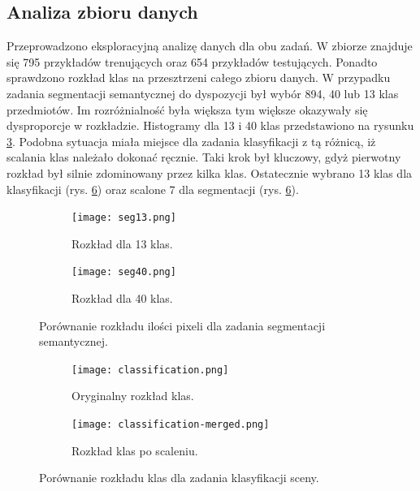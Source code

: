 \subsection{Analiza zbioru danych}
Przeprowadzono eksploracyjną analizę danych dla obu zadań. W zbiorze znajduje się 795 przykładów trenujących oraz 654 przykładów testujących. Ponadto sprawdzono rozkład klas na przesztrzeni całego zbioru danych.
W przypadku zadania segmentacji semantycznej do dyspozycji był wybór 894, 40 lub 13 klas przedmiotów. Im rozróżnialność była większa tym większe okazywały się dysproporcje w rozkładzie. Histogramy dla 13 i 40 klas przedstawiono na rysunku \ref{fig:rozklad-segm}.
Podobna sytuacja miała miejsce dla zadania klasyfikacji z tą różnicą, iż scalania klas należało dokonać ręcznie. Taki krok był kluczowy, gdyż pierwotny rozkład był silnie zdominowany przez kilka klas.
Ostatecznie wybrano 13 klas dla klasyfikacji (rys. \ref{fig:7 klas dystrybucja}) oraz scalone 7 dla segmentacji (rys. \ref{fig:7 klas dystrybucja}).
\begin{figure}[ht!]
    \centering
    \begin{subfigure}[b]{0.49\textwidth}
        \centering
        \texttt{[image: seg13.png]}
        \caption{Rozkład dla 13 klas.}
        \label{fig:rozklad-13klas-seg}
    \end{subfigure}
    \hfill
    \begin{subfigure}[b]{0.49\textwidth}
        \centering
        \texttt{[image: seg40.png]}
        \caption{Rozkład dla 40 klas.}
        \label{fig:rozklad-40klas-seg}
    \end{subfigure}
    \caption[]{Porównanie rozkładu ilości pixeli dla zadania segmentacji semantycznej.}
    \label{fig:rozklad-segm}
\end{figure}
\begin{figure}
    \centering
    \begin{subfigure}[b]{0.49\textwidth}
        \centering
        \texttt{[image: classification.png]}
        \caption{Oryginalny rozkład klas.}
        \label{fig:27 klas dystrybucja}
    \end{subfigure}
    \hfill
    \begin{subfigure}[b]{0.49\textwidth}
        \centering
        \texttt{[image: classification-merged.png]}
        \caption{Rozkład klas po scaleniu.}
        \label{fig:7 klas dystrybucja}
    \end{subfigure}
    \caption[]{Porównanie rozkładu klas dla zadania klasyfikacji sceny.}
\end{figure}

